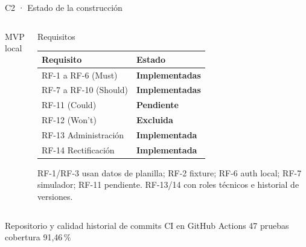 \documentclass[aspectratio=169,10pt]{beamer}
\newcommand{\good}[1]{\textcolor{GoodGreen}{\textbf{#1}}}
\newcommand{\warn}[1]{\textcolor{WarnAmber}{\textbf{#1}}}
\begin{document}
\begin{frame}{C2 · Estado de la construcción}
  \begin{columns}[T,onlytextwidth]
      \begin{block}{MVP local}
      \end{block}
      \begin{block}{Requisitos}
      \scriptsize
      \begin{tabular}{@{}ll@{}}
        \toprule
        \textbf{Requisito} & \textbf{Estado} \\
        \midrule
        RF-1 a RF-6 (Must) & \good{Implementadas} \\
        RF-7 a RF-10 (Should) & \good{Implementadas} \\
        RF-11 (Could) & \warn{Pendiente} \\
        RF-12 (Won't) & \warn{Excluida} \\
        RF-13 Administración & \good{Implementada} \\
        RF-14 Rectificación & \good{Implementada} \\
        \bottomrule
      \end{tabular}
      \vspace{1mm}

      {\tiny RF-1/RF-3 usan datos de planilla; RF-2 fixture; RF-6 auth local; RF-7 simulador; RF-11 pendiente. RF-13/14 con roles técnicos e historial de versiones.}
      \end{block}
  \end{columns}
  \vspace{1mm}
  \begin{block}{Repositorio y calidad}
    historial de commits \textbullet{} CI en GitHub Actions \textbullet{} 47 pruebas \textbullet{} cobertura 91,46\,\%
  \end{block}
\end{frame}
\end{document}
